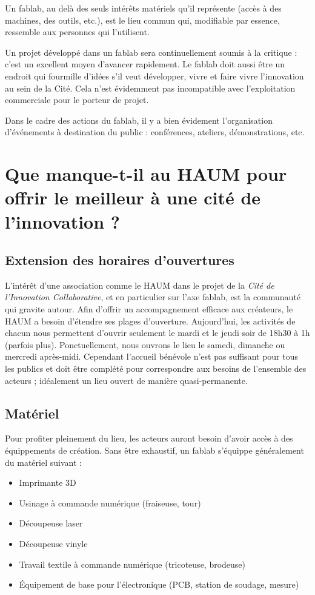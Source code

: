 \documentclass[a4paper,10pt]{scrartcl}
\begin{document}
Un fablab, au delà des seuls intérêts matériels qu'il représente (accès à des machines, des outils, etc.), est le lieu commun qui, modifiable par essence, ressemble aux personnes qui l'utilisent.

Un projet développé dans un fablab sera continuellement soumis à la critique : c'est un excellent moyen d'avancer rapidement. Le fablab doit aussi être un endroit qui fourmille d'idées s'il veut développer, vivre et faire vivre l'innovation au sein de la Cité. Cela n'est évidemment pas incompatible avec l'exploitation commerciale pour le porteur de projet. 

Dans le cadre des actions du fablab, il y a bien évidement l'organisation d’événements à destination du public : conférences, ateliers, démonstrations, etc.

\section{Que manque-t-il au HAUM pour offrir le meilleur à une cité de l'innovation ?}

\subsection*{Extension des horaires d'ouvertures}

L'intérêt d'une association comme le HAUM dans le projet de la \emph{Cité de l'Innovation Collaborative}, et en particulier sur l'axe fablab, est la communauté qui gravite autour.
Afin d'offrir un accompagnement efficace aux créateurs, le HAUM a besoin d'étendre ses plages d'ouverture. Aujourd'hui, les activités de chacun nous permettent d'ouvrir seulement le mardi et le jeudi soir de 18h30 à 1h (parfois plus). Ponctuellement, nous ouvrons le lieu le samedi, dimanche ou mercredi après-midi.
Cependant l'accueil bénévole n'est pas suffisant pour tous les publics et doit être complété pour correspondre aux besoins de l'ensemble des acteurs ; idéalement un lieu ouvert de manière quasi-permanente.

\subsection*{Matériel}

Pour profiter pleinement du lieu, les acteurs auront besoin d'avoir accès à des équippements de création.
Sans être exhaustif, un fablab s'équippe généralement du matériel suivant :

\begin{itemize}
 \item Imprimante 3D
 \item Usinage à commande numérique (fraiseuse, tour)
 \item Découpeuse laser
 \item Découpeuse vinyle
 \item Travail textile à commande numérique (tricoteuse, brodeuse)
 \item Équipement de base pour l'électronique (PCB, station de soudage, mesure)
\end{itemize}
\end{document}
